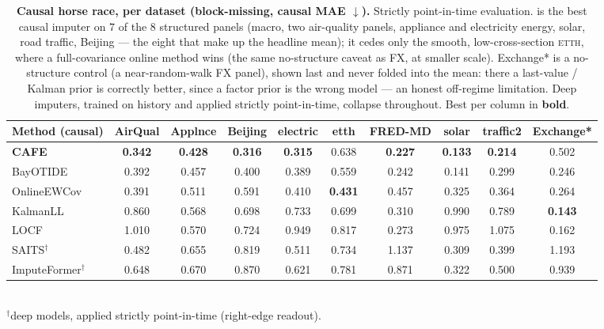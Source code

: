 \begin{table}[tbp]\centering\small
\setlength{\tabcolsep}{4pt}
\caption{\textbf{Causal horse race, per dataset (block-missing, causal MAE $\downarrow$).} Strictly point-in-time evaluation. \cafe{} is the best causal imputer on $7$ of the $8$ structured panels (macro, two air-quality panels, appliance and electricity energy, solar, road traffic, Beijing --- the eight that make up the headline mean); it cedes only the smooth, low-cross-section \textsc{etth}, where a full-covariance online method wins (the same no-structure caveat as FX, at smaller scale). Exchange* is a no-structure control (a near-random-walk FX panel), shown last and never folded into the mean: there a last-value / Kalman prior is correctly better, since a factor prior is the wrong model --- an honest off-regime limitation. Deep imputers, trained on history and applied strictly point-in-time, collapse throughout. Best per column in \textbf{bold}.}
\label{tab:horseraceperds}
\begin{tabular}{@{}lccccccccc@{}}
\toprule
Method (causal) & AirQual & Applnce & Beijing & electric & etth & FRED-MD & solar & traffic2 & Exchange* \\
\midrule
\textbf{CAFE} & \textbf{0.342} & \textbf{0.428} & \textbf{0.316} & \textbf{0.315} & 0.638 & \textbf{0.227} & \textbf{0.133} & \textbf{0.214} & 0.502 \\
BayOTIDE & 0.392 & 0.457 & 0.400 & 0.389 & 0.559 & 0.242 & 0.141 & 0.299 & 0.246 \\
OnlineEWCov & 0.391 & 0.511 & 0.591 & 0.410 & \textbf{0.431} & 0.457 & 0.325 & 0.364 & 0.264 \\
KalmanLL & 0.860 & 0.568 & 0.698 & 0.733 & 0.699 & 0.310 & 0.990 & 0.789 & \textbf{0.143} \\
LOCF & 1.010 & 0.570 & 0.724 & 0.949 & 0.817 & 0.273 & 0.975 & 1.075 & 0.162 \\
\midrule
SAITS$^\dagger$ & 0.482 & 0.655 & 0.819 & 0.511 & 0.734 & 1.137 & 0.309 & 0.399 & 1.193 \\
ImputeFormer$^\dagger$ & 0.648 & 0.670 & 0.870 & 0.621 & 0.781 & 0.871 & 0.322 & 0.500 & 0.939 \\
\bottomrule
\end{tabular}
 \\[2pt]{\footnotesize $^\dagger$deep models, applied strictly point-in-time (right-edge readout).}
\end{table}
